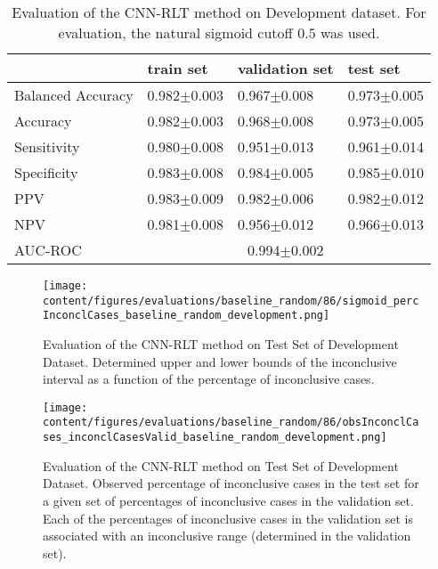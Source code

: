 \begin{table}[ht]
  \caption{Evaluation of the CNN-RLT method on Development dataset. 
  For evaluation, the natural sigmoid cutoff $0.5$ was used.}
  \centering
  \begin{tabular}{llll}
      \hline
                        & train set         & validation set      & test set             \\
      \hline
      Balanced Accuracy & 0.982$\pm$0.003   &  0.967$\pm$0.008    &  0.973$\pm$0.005  \\
      Accuracy          & 0.982$\pm$0.003    &   0.968$\pm$0.008   &  0.973$\pm$0.005  \\
      Sensitivity       &  0.980$\pm$0.008  &   0.951$\pm$0.013  &  0.961$\pm$0.014 \\
      Specificity       &   0.983$\pm$0.008   &   0.984$\pm$0.005  &   0.985$\pm$0.010 \\
      PPV               &  0.983$\pm$0.009   &   0.982$\pm$0.006   &  0.982$\pm$0.012   \\
      NPV               &  0.981$\pm$0.008   &   0.956$\pm$0.012   & 0.966$\pm$0.013  \\
      \hline
      AUC-ROC          &  \multicolumn{3}{c}{0.994$\pm$0.002}  \\
      \hline
  \end{tabular}
 \label{t1:cnn_rlt_perf_eval_table}
\end{table}


\begin{figure}[t]
  \centering
  \texttt{[image: content/figures/evaluations/baseline\_random/86/sigmoid\_percInconclCases\_baseline\_random\_development.png]}
  \caption{Evaluation of the CNN-RLT method on Test Set of Development Dataset. 
  Determined upper and lower bounds of the inconclusive interval as a function of the percentage of inconclusive cases.} 
  \label{fig:baseline_random_percInconclCases_development}
\end{figure}


\begin{figure}[h]
  \centering
  \texttt{[image: content/figures/evaluations/baseline\_random/86/obsInconclCases\_inconclCasesValid\_baseline\_random\_development.png]}
  \caption{Evaluation of the CNN-RLT method on Test Set of Development Dataset.
  Observed percentage of inconclusive cases in the test set 
  for a given set of percentages of inconclusive cases in the validation set.
  Each of the percentages of inconclusive cases in the validation set is associated 
  with an inconclusive range (determined in the validation set).} 
  \label{fig:obsInconclCases_inconclCasesValid_baseline_random_development}
\end{figure} 


